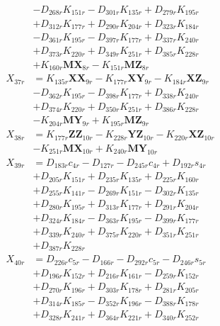 \begin{multicols}{2}
\begin{align}
&- D_{268r}K_{151r} - D_{301r}K_{135r} + D_{279r}K_{195r}  \nonumber \\
&+ D_{312r}K_{177r} + D_{290r}K_{204r} + D_{323r}K_{184r}  \nonumber \\
&- D_{361r}K_{195r} - D_{397r}K_{177r} + D_{337r}K_{240r}  \nonumber \\
&+ D_{373r}K_{220r} + D_{349r}K_{251r} + D_{385r}K_{228r}  \nonumber \\
&+ K_{160r}\mathbf{MX}_{8r} - K_{151r}\mathbf{MZ}_{8r} \nonumber \\
X_{37r} &= K_{135r}\mathbf{XX}_{9r} - K_{177r}\mathbf{XY}_{9r} - K_{184r}\mathbf{XZ}_{9r}  \nonumber \\
&- D_{362r}K_{195r} - D_{398r}K_{177r} + D_{338r}K_{240r}  \nonumber \\
&+ D_{374r}K_{220r} + D_{350r}K_{251r} + D_{386r}K_{228r}  \nonumber \\
&- K_{204r}\mathbf{MY}_{9r} + K_{195r}\mathbf{MZ}_{9r} \nonumber \\
X_{38r} &= K_{177r}\mathbf{ZZ}_{10r} - K_{228r}\mathbf{YZ}_{10r} - K_{220r}\mathbf{XZ}_{10r}  \nonumber \\
&- K_{251r}\mathbf{MX}_{10r} + K_{240r}\mathbf{MY}_{10r} \nonumber \\
X_{39r} &= D_{183r}c_{4r} - D_{127r} - D_{245r}c_{4r} + D_{192r}s_{4r}  \nonumber \\
&+ D_{205r}K_{151r} + D_{235r}K_{135r} + D_{225r}K_{160r}  \nonumber \\
&+ D_{255r}K_{141r} - D_{269r}K_{151r} - D_{302r}K_{135r}  \nonumber \\
&+ D_{280r}K_{195r} + D_{313r}K_{177r} + D_{291r}K_{204r}  \nonumber \\
&+ D_{324r}K_{184r} - D_{363r}K_{195r} - D_{399r}K_{177r}  \nonumber \\
&+ D_{339r}K_{240r} + D_{375r}K_{220r} + D_{351r}K_{251r}  \nonumber \\
&+ D_{387r}K_{228r} \nonumber \\
X_{40r} &= D_{226r}c_{5r} - D_{166r} - D_{292r}c_{5r} - D_{246r}s_{5r}  \nonumber \\
&+ D_{196r}K_{152r} + D_{216r}K_{161r} - D_{259r}K_{152r}  \nonumber \\
&+ D_{270r}K_{196r} + D_{303r}K_{178r} + D_{281r}K_{205r}  \nonumber \\
&+ D_{314r}K_{185r} - D_{352r}K_{196r} - D_{388r}K_{178r}  \nonumber \\
&+ D_{328r}K_{241r} + D_{364r}K_{221r} + D_{340r}K_{252r}  \nonumber \\

\end{align}
\end{multicols}
